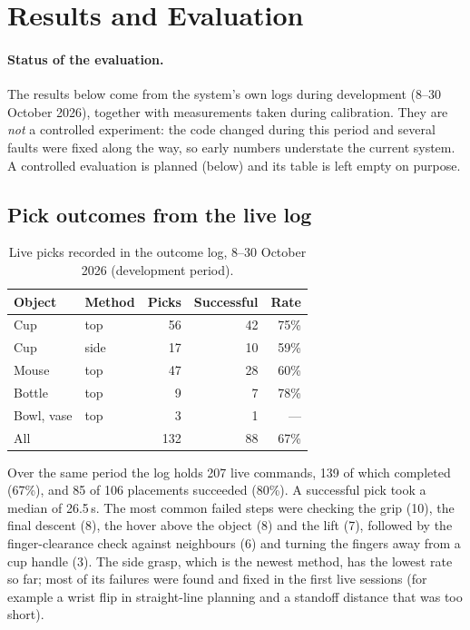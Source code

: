 \documentclass[12pt]{article}
\begin{document}
\section{Results and Evaluation}
\label{sec:results}

\paragraph{Status of the evaluation.}
The results below come from the system's own logs during development (8--30 October 2026), together with measurements taken during calibration. They are \emph{not} a controlled experiment: the code changed during this period and several faults were fixed along the way, so early numbers understate the current system. A controlled evaluation is planned (below) and its table is left empty on purpose.

\subsection{Pick outcomes from the live log}

\begin{table}[H]
\centering
\caption{Live picks recorded in the outcome log, 8--30 October 2026 (development period).}
\label{tab:picks}
\begin{tabular}{llrrr}
\toprule
Object & Method & Picks & Successful & Rate \\
\midrule
Cup    & top  & 56 & 42 & 75\% \\
Cup    & side & 17 & 10 & 59\% \\
Mouse  & top  & 47 & 28 & 60\% \\
Bottle & top  &  9 &  7 & 78\% \\
Bowl, vase & top & 3 & 1 & --- \\
\midrule
All    &      & 132 & 88 & 67\% \\
\bottomrule
\end{tabular}
\end{table}

Over the same period the log holds 207 live commands, 139 of which completed (67\%), and 85 of 106 placements succeeded (80\%). A successful pick took a median of 26.5\,s. The most common failed steps were checking the grip (10), the final descent (8), the hover above the object (8) and the lift (7), followed by the finger-clearance check against neighbours (6) and turning the fingers away from a cup handle (3). The side grasp, which is the newest method, has the lowest rate so far; most of its failures were found and fixed in the first live sessions (for example a wrist flip in straight-line planning and a standoff distance that was too short).
\end{document}
